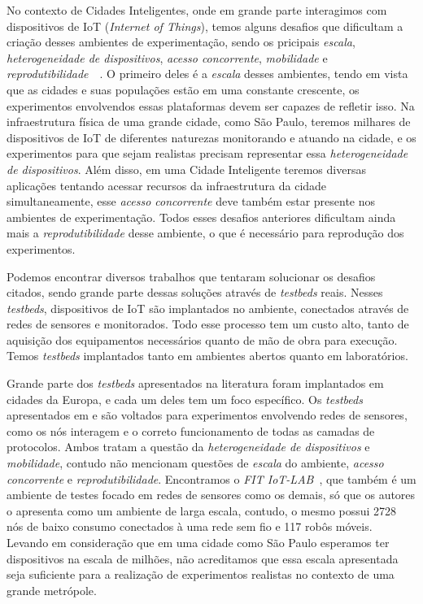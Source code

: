 No contexto de Cidades Inteligentes, onde em grande parte interagimos com dispositivos de IoT (\textit{Internet of Things}), temos alguns desafios que dificultam a criação desses ambientes de
experimentação, sendo os pricipais \textit{escala}, \textit{heterogeneidade de dispositivos}, \textit{acesso concorrente}, \textit{mobilidade} e 
\textit{reprodutibilidade}~\cite{gluhak_2011}~\cite{sanchez_2014}.
O primeiro deles é a \textit{escala} desses ambientes, tendo em vista que as cidades e suas populações estão em uma constante crescente, os experimentos envolvendos essas plataformas devem ser capazes
de refletir isso.
Na infraestrutura física de uma grande cidade, como São Paulo, teremos milhares de dispositivos de IoT de diferentes naturezas monitorando e atuando na cidade, e os experimentos para que sejam realistas
precisam representar essa \textit{heterogeneidade de dispositivos}.
Além disso, em uma Cidade Inteligente teremos diversas aplicações tentando acessar recursos da infraestrutura da cidade simultaneamente, esse \textit{acesso concorrente} deve também estar presente nos
ambientes de experimentação.
Todos esses desafios anteriores dificultam ainda mais a \textit{reprodutibilidade} desse ambiente, o que é necessário para reprodução dos experimentos. 

Podemos encontrar diversos trabalhos que tentaram solucionar os desafios citados, sendo grande parte dessas soluções através de \textit{testbeds} reais.
Nesses \textit{testbeds}, dispositivos de IoT são implantados no ambiente, conectados através de redes de sensores e monitorados.
Todo esse processo tem um custo alto, tanto de aquisição dos equipamentos necessários quanto de mão de obra para execução.
Temos \textit{testbeds} implantados tanto em ambientes abertos quanto em laboratórios.

Grande parte dos \textit{testbeds} apresentados na literatura foram implantados em cidades da Europa, e cada um deles tem um foco específico.
Os \textit{testbeds} apresentados em  \cite{olivares_2013} e \cite{cenedese_2014} são voltados para experimentos envolvendo redes de sensores, como os nós interagem e o correto
funcionamento de todas as camadas de protocolos.
Ambos tratam a questão da \textit{heterogeneidade de dispositivos} e \textit{mobilidade}, contudo não mencionam questões de \textit{escala} do ambiente,
\textit{acesso concorrente} e \textit{reprodutibilidade}.
Encontramos o \textit{FIT IoT-LAB}~\cite{adjih_2015}, que também é um ambiente de testes focado em redes de sensores como os demais, só que os autores o apresenta como um ambiente de larga escala,
contudo, o mesmo possui 2728 nós de baixo consumo conectados à uma rede sem fio e 117 robôs móveis.
Levando em consideração que em uma cidade como São Paulo esperamos ter dispositivos na escala de milhões, não acreditamos que essa escala apresentada seja suficiente para a realização de experimentos
realistas no contexto de uma grande metrópole.

